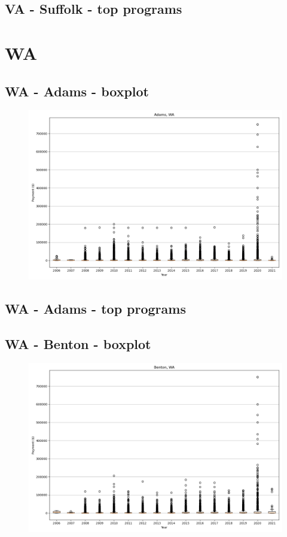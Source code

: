 \subsection*{VA - Suffolk - top programs}

\newpage
\section*{WA}
\subsection*{WA - Adams - boxplot}
\begin{figure}[h]
\centering
\includegraphics[width=7in]{../output/boxplots/counties/Adams-WA_boxplot.png}
\end{figure}


\subsection*{WA - Adams - top programs}

\newpage
\subsection*{WA - Benton - boxplot}
\begin{figure}[h]
\centering
\includegraphics[width=7in]{../output/boxplots/counties/Benton-WA_boxplot.png}
\end{figure}



